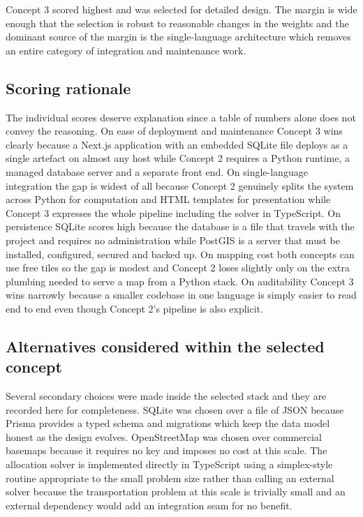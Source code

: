 \documentclass[12pt,a4paper]{report}
\begin{document}
Concept 3 scored highest and was selected for detailed design. The
margin is wide enough that the selection is robust to reasonable
changes in the weights and the dominant source of the margin is the
single-language architecture which removes an entire category of
integration and maintenance work.

\subsection{Scoring rationale}
The individual scores deserve explanation since a table of numbers
alone does not convey the reasoning. On ease of deployment and
maintenance Concept 3 wins clearly because a Next.js application with
an embedded SQLite file deploys as a single artefact on almost any
host while Concept 2 requires a Python runtime, a managed database
server and a separate front end. On single-language integration the
gap is widest of all because Concept 2 genuinely splits the system
across Python for computation and HTML templates for presentation
while Concept 3 expresses the whole pipeline including the solver in
TypeScript. On persistence SQLite scores high because the database is
a file that travels with the project and requires no administration
while PostGIS is a server that must be installed, configured, secured
and backed up. On mapping cost both concepts can use free tiles so
the gap is modest and Concept 2 loses slightly only on the extra
plumbing needed to serve a map from a Python stack. On auditability
Concept 3 wins narrowly because a smaller codebase in one language is
simply easier to read end to end even though Concept 2's pipeline is
also explicit.

\subsection{Alternatives considered within the selected concept}
Several secondary choices were made inside the selected stack and they
are recorded here for completeness. SQLite was chosen over a file of
JSON because Prisma provides a typed schema and migrations which keep
the data model honest as the design evolves. OpenStreetMap was chosen
over commercial basemaps because it requires no key and imposes no
cost at this scale. The allocation solver is implemented directly in
TypeScript using a simplex-style routine appropriate to the small
problem size rather than calling an external solver because the
transportation problem at this scale is trivially small and an external
dependency would add an integration seam for no benefit.
\end{document}
